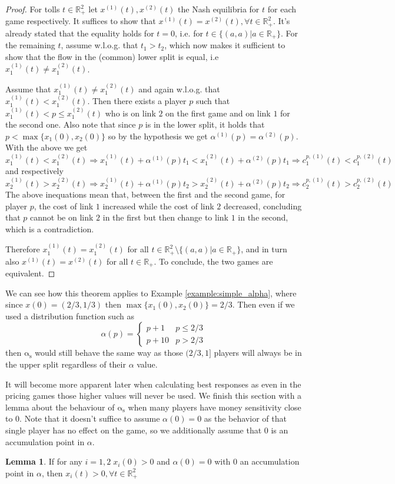 \documentclass[10pt,a4paper]{book}
\newcommand{\as}{\mathrm{\alpha_s}}
\newcommand{\R}{\mathbb{R}}
\theoremstyle{definition}
\newtheorem{lemma}[definition]{Lemma}
\theoremstyle{comment}
\begin{document}
\begin{proof}
	For tolls $t \in \R_+^2$ let $x^{(1)}(t), x^{(2)}(t)$ the Nash equilibria for $t$ for each game respectively.
	It suffices to show that $x^{(1)}(t) = x^{(2)}(t), \forall t \in \R_+^2$.
	It's already stated that the equality holds for $t = 0$, i.e. for $t \in \{(a, a) | a \in \R_+\}$.
	For the remaining $t$, assume w.l.o.g. that $t_1 > t_2$, which now makes it sufficient to show that the flow in the (common) lower split is equal, i.e $x_1^{(1)}(t) \ne x_1^{(2)}(t)$.

	Assume that $x_1^{(1)}(t) \ne x_1^{(2)}(t)$ and again w.l.o.g. that $x_1^{(1)}(t) < x_1^{(2)}(t)$.
	Then there exists a player $p$ such that $x_1^{(1)}(t) < p \le x_1^{(2)}(t)$ who is on link $2$ on the first game and on link $1$ for the second one.
	Also note that since $p$ is in the lower split, it holds that $p < \max\{x_1(0), x_2(0)\}$ so by the hypothesis we get $\alpha^{(1)}(p) = \alpha^{(2)}(p)$.
	With the above we get
	\[x_1^{(1)}(t) < x_1^{(2)}(t) \Rightarrow x_1^{(1)}(t) + \alpha^{(1)}(p)t_1 < x_1^{(2)}(t) + \alpha^{(2)}(p)t_1 \Rightarrow c_1^{p, (1)}(t) < c_1^{p, (2)}(t)\]
	and respectively
	\[x_2^{(1)}(t) > x_2^{(2)}(t) \Rightarrow x_2^{(1)}(t) + \alpha^{(1)}(p)t_2 > x_2^{(2)}(t) + \alpha^{(2)}(p)t_2 \Rightarrow c_2^{p, (1)}(t) > c_2^{p, (2)}(t)\]
	The above inequations mean that, between the first and the second game, for player $p$, the cost of link $1$ increased while the cost of link $2$ decreased, concluding that $p$ cannot be on link $2$ in the first but then change to link $1$ in the second, which is a contradiction.

	Therefore $x_1^{(1)}(t) = x_1^{(2)}(t)$ for all $t \in \R_+^2 \setminus \{(a, a) | a \in \R_+\}$, and in turn also $x^{(1)}(t) = x^{(2)}(t)$ for all $t \in \R_+$.
	To conclude, the two games are equivalent.
\end{proof}
We can see how this theorem applies to Example \ref{example:simple_alpha}, where since $x(0) = (2/3, 1/3)$ then $\max\{x_1(0), x_2(0)\} = 2/3$.
Then even if we used a distribution function such as
\[
	\alpha(p) =
	\begin{cases}
		p + 1 & p \le 2/3 \\
		p + 10 & p > 2/3
	\end{cases}
\]
then $\as$ would still behave the same way as those $(2/3, 1]$ players will always be in the upper split regardless of their $\alpha$ value.

It will become more apparent later when calculating best responses as even in the pricing games those higher values will never be used.
We finish this section with a lemma about the behaviour of $\as$ when many players have money sensitivity close to 0.
Note that it doesn't suffice to assume $\alpha(0) = 0$ as the behavior of that single player has no effect on the game, so we additionally assume that $0$ is an accumulation point in $\alpha$.
\begin{lemma}
	If for any $i = 1, 2 \; x_i(0) > 0$ and $\alpha(0) = 0$ with $0$ an accumulation point in $\alpha$, then $x_i(t) > 0, \forall t \in \R_+^2$
\end{lemma}
\end{document}
